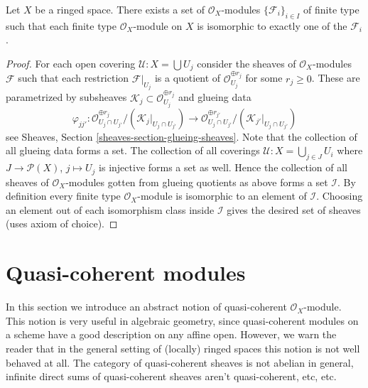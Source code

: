 \begin{lemma}
\label{lemma-set-isomorphism-classes-finite-type-modules}
Let $X$ be a ringed space.
There exists a set of $\mathcal{O}_X$-modules
$\{\mathcal{F}_i\}_{i \in I}$ of finite type
such that each finite type $\mathcal{O}_X$-module
on $X$ is isomorphic to exactly one of the $\mathcal{F}_i$.
\end{lemma}

\begin{proof}
For each open covering $\mathcal{U} : X = \bigcup U_j$ consider the
sheaves of $\mathcal{O}_X$-modules $\mathcal{F}$ such that each
restriction $\mathcal{F}|_{U_j}$ is a quotient of
$\mathcal{O}_{U_j}^{\oplus r_j}$ for some $r_j \geq 0$.
These are parametrized by subsheaves
$\mathcal{K}_j \subset \mathcal{O}_{U_j}^{\oplus r_j}$ and glueing
data
$$
\varphi_{jj'} :
\mathcal{O}_{U_j \cap U_{j'}}^{\oplus r_j}/
(\mathcal{K}_j|_{U_j \cap U_{j'}})
\longrightarrow
\mathcal{O}_{U_j \cap U_{j'}}^{\oplus r_{j'}}/
(\mathcal{K}_{j'}|_{U_j \cap U_{j'}})
$$
see Sheaves, Section \ref{sheaves-section-glueing-sheaves}.
Note that the collection of all glueing data forms a set.
The collection of all coverings $\mathcal{U} : X = \bigcup_{j \in J} U_i$
where $J \to \mathcal{P}(X)$, $j \mapsto U_j$ is injective forms a set as
well. Hence the collection of all sheaves of $\mathcal{O}_X$-modules
gotten from glueing quotients as above forms a set $\mathcal{I}$.
By definition every finite type $\mathcal{O}_X$-module
is isomorphic to an element of $\mathcal{I}$. Choosing an
element out of each isomorphism class inside $\mathcal{I}$
gives the desired set of sheaves (uses axiom of choice).
\end{proof}













\section{Quasi-coherent modules}
\label{section-quasi-coherent}

\noindent
In this section we introduce an abstract notion of
quasi-coherent $\mathcal{O}_X$-module. This notion is very
useful in algebraic geometry, since quasi-coherent modules
on a scheme have a good description on any affine open.
However, we warn the reader that
in the general setting of (locally) ringed spaces
this notion is not well behaved at all. The category of
quasi-coherent sheaves is not abelian in general, infinite
direct sums of quasi-coherent sheaves aren't quasi-coherent, etc, etc.

